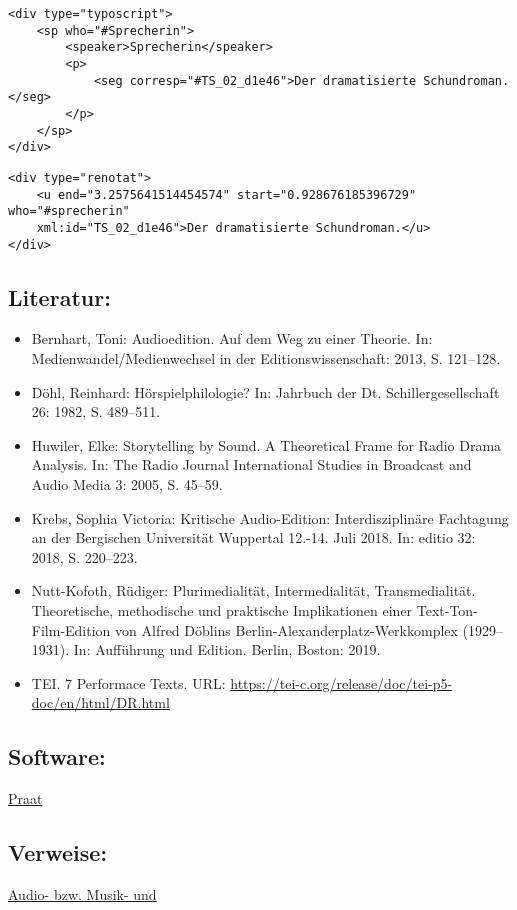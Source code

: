 \documentclass{article}
\begin{document}
        \begin{verbatim}<div type="typoscript">
    <sp who="#Sprecherin">
        <speaker>Sprecherin</speaker>
        <p>
            <seg corresp="#TS_02_d1e46">Der dramatisierte Schundroman.</seg>
        </p>
    </sp>
</div>\end{verbatim}\begin{verbatim}<div type="renotat">
    <u end="3.2575641514454574" start="0.928676185396729" who="#sprecherin"
    xml:id="TS_02_d1e46">Der dramatisierte Schundroman.</u>
</div>\end{verbatim}\subsection*{Literatur:}\begin{itemize}\item Bernhart, Toni: Audioedition. Auf dem Weg zu einer Theorie. In: Medienwandel/Medienwechsel in der
                              Editionswissenschaft: 2013, S. 121–128.\item Döhl, Reinhard: Hörspielphilologie? In: Jahrbuch der Dt. Schillergesellschaft 26: 1982, S. 489–511.\item Huwiler, Elke: Storytelling by Sound. A Theoretical Frame for Radio
                              Drama Analysis. In: The Radio Journal International Studies in Broadcast and
                              Audio Media 3: 2005, S. 45–59.\item Krebs, Sophia Victoria: Kritische Audio-Edition: Interdisziplinäre Fachtagung an
                              der Bergischen Universität Wuppertal 12.-14. Juli 2018. In: editio 32: 2018, S. 220–223.\item Nutt-Kofoth, Rüdiger: Plurimedialität, Intermedialität, Transmedialität.
                              Theoretische, methodische und praktische Implikationen einer Text-Ton-
                              Film-Edition von Alfred Döblins Berlin-Alexanderplatz-Werkkomplex
                              (1929–1931). In: Aufführung und Edition. Berlin, Boston: 2019.\item TEI. 7 Performace Texts. URL: \url{https://tei-c.org/release/doc/tei-p5-doc/en/html/DR.html}\end{itemize}\subsection*{Software:}\href{http://www.fon.hum.uva.nl/praat/}{Praat}\subsection*{Verweise:}\href{https://gams.uni-graz.at/o:konde.121}{Audio- bzw. Musik- und
}
\end{document}
